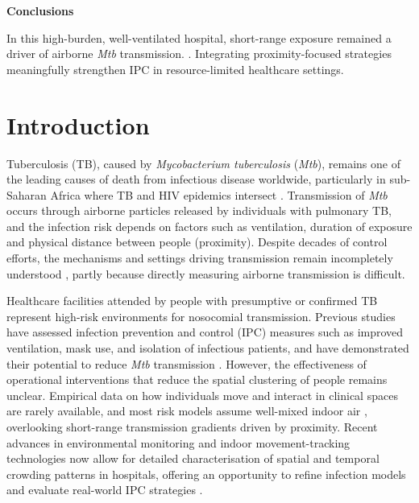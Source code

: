 \documentclass[11pt]{article}
\begin{document}
\textbf{Conclusions}

In this high-burden, well-ventilated hospital, short-range exposure remained a driver of airborne \emph{Mtb} transmission. .\label{chg:R2.30abs} Integrating proximity-focused strategies  meaningfully strengthen IPC in resource-limited healthcare settings.\label{chg:R2.1abs3}

\section{Introduction}\label{introduction}

Tuberculosis (TB), caused by \emph{Mycobacterium tuberculosis} (\emph{Mtb}), remains one of the leading causes of death from infectious disease worldwide, particularly in sub-Saharan Africa where TB and HIV epidemics intersect \cite{worldhealthorganization2024}. Transmission of \emph{Mtb} occurs through airborne particles released by individuals with pulmonary TB, and the infection risk depends on factors such as ventilation, duration of exposure and physical distance between people (proximity). Despite decades of control efforts, the mechanisms and settings driving transmission remain incompletely understood \cite{yates2016LancetInfectDis}, partly because directly measuring airborne transmission is difficult.

Healthcare facilities attended by people with presumptive or confirmed TB represent high-risk environments for nosocomial transmission. Previous studies have assessed infection prevention and control (IPC) measures such as improved ventilation, mask use, and isolation of infectious patients, and have demonstrated their potential to reduce \emph{Mtb} transmission \cite{mccreesh2021BMJGlobHealth,mccreesh2022BMJGlobHealth,dharmadhikari2012AmJRespirCritCareMed,banholzer2025IntJInfectDis,banholzer2025PLOSComputBiol}. However, the effectiveness of operational interventions that reduce the spatial clustering of people remains unclear. Empirical data on how individuals move and interact in clinical spaces are rarely available, and most risk models assume well-mixed indoor air \cite{yates2016LancetInfectDis,riley1978AmJEpidemiol,rudnick2003IndoorAira}, overlooking short-range transmission gradients driven by proximity. Recent advances in environmental monitoring and indoor movement-tracking technologies now allow for detailed characterisation of spatial and temporal crowding patterns in hospitals, offering an opportunity to refine infection models and evaluate real-world IPC strategies \cite{banholzer2025PLOSComputBiol,zurcher2022JInfectDis}.
\end{document}
